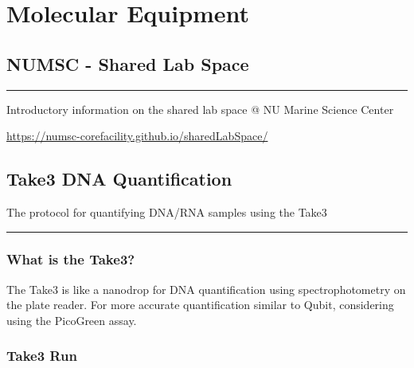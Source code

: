 \documentclass[
  letterpaper,
  DIV=11,
  numbers=noendperiod]{scrreprt}
\begin{document}
\part{Molecular Equipment}

\hypertarget{numsc---shared-lab-space}{%
\chapter{NUMSC - Shared Lab Space}\label{numsc---shared-lab-space}}

\begin{center}\rule{0.5\linewidth}{0.5pt}\end{center}

Introductory information on the shared lab space @ NU Marine Science
Center

\url{https://numsc-corefacility.github.io/sharedLabSpace/}

\hypertarget{take3-dna-quantification}{%
\chapter{Take3 DNA Quantification}\label{take3-dna-quantification}}

The protocol for quantifying DNA/RNA samples using the Take3

\begin{center}\rule{0.5\linewidth}{0.5pt}\end{center}

\hypertarget{what-is-the-take3}{%
\section*{\texorpdfstring{\textbf{What is the
Take3?}}{What is the Take3?}}\label{what-is-the-take3}}


The Take3 is like a nanodrop for DNA quantification using
spectrophotometry on the plate reader. For more accurate quantification
similar to Qubit, considering using the PicoGreen assay.

\hypertarget{take3-run}{%
\section*{\texorpdfstring{\textbf{Take3
Run}}{Take3 Run}}\label{take3-run}}

\end{document}
